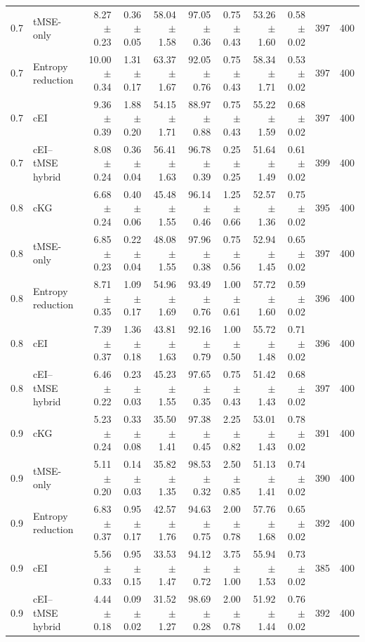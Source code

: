 \begin{tabular}{@{}clrrrrrrrrr@{}}
0.7 & tMSE-only & 8.27 $\pm$ 0.23 & 0.36 $\pm$ 0.05 & 58.04 $\pm$ 1.58 & 97.05 $\pm$ 0.36 & 0.75 $\pm$ 0.43 & 53.26 $\pm$ 1.60 & 0.58 $\pm$ 0.02 & 397 & 400 \\
0.7 & Entropy reduction & 10.00 $\pm$ 0.34 & 1.31 $\pm$ 0.17 & 63.37 $\pm$ 1.67 & 92.05 $\pm$ 0.76 & 0.75 $\pm$ 0.43 & 58.34 $\pm$ 1.71 & 0.53 $\pm$ 0.02 & 397 & 400 \\
0.7 & cEI & 9.36 $\pm$ 0.39 & 1.88 $\pm$ 0.20 & 54.15 $\pm$ 1.71 & 88.97 $\pm$ 0.88 & 0.75 $\pm$ 0.43 & 55.22 $\pm$ 1.59 & 0.68 $\pm$ 0.02 & 397 & 400 \\
0.7 & cEI--tMSE hybrid & 8.08 $\pm$ 0.24 & 0.36 $\pm$ 0.04 & 56.41 $\pm$ 1.63 & 96.78 $\pm$ 0.39 & 0.25 $\pm$ 0.25 & 51.64 $\pm$ 1.49 & 0.61 $\pm$ 0.02 & 399 & 400 \\
0.8 & cKG & 6.68 $\pm$ 0.24 & 0.40 $\pm$ 0.06 & 45.48 $\pm$ 1.55 & 96.14 $\pm$ 0.46 & 1.25 $\pm$ 0.66 & 52.57 $\pm$ 1.36 & 0.75 $\pm$ 0.02 & 395 & 400 \\
0.8 & tMSE-only & 6.85 $\pm$ 0.23 & 0.22 $\pm$ 0.04 & 48.08 $\pm$ 1.55 & 97.96 $\pm$ 0.38 & 0.75 $\pm$ 0.56 & 52.94 $\pm$ 1.45 & 0.65 $\pm$ 0.02 & 397 & 400 \\
0.8 & Entropy reduction & 8.71 $\pm$ 0.35 & 1.09 $\pm$ 0.17 & 54.96 $\pm$ 1.69 & 93.49 $\pm$ 0.76 & 1.00 $\pm$ 0.61 & 57.72 $\pm$ 1.60 & 0.59 $\pm$ 0.02 & 396 & 400 \\
0.8 & cEI & 7.39 $\pm$ 0.37 & 1.36 $\pm$ 0.18 & 43.81 $\pm$ 1.63 & 92.16 $\pm$ 0.79 & 1.00 $\pm$ 0.50 & 55.72 $\pm$ 1.48 & 0.71 $\pm$ 0.02 & 396 & 400 \\
0.8 & cEI--tMSE hybrid & 6.46 $\pm$ 0.22 & 0.23 $\pm$ 0.03 & 45.23 $\pm$ 1.55 & 97.65 $\pm$ 0.35 & 0.75 $\pm$ 0.43 & 51.42 $\pm$ 1.43 & 0.68 $\pm$ 0.02 & 397 & 400 \\
0.9 & cKG & 5.23 $\pm$ 0.24 & 0.33 $\pm$ 0.08 & 35.50 $\pm$ 1.41 & 97.38 $\pm$ 0.45 & 2.25 $\pm$ 0.82 & 53.01 $\pm$ 1.43 & 0.78 $\pm$ 0.02 & 391 & 400 \\
0.9 & tMSE-only & 5.11 $\pm$ 0.20 & 0.14 $\pm$ 0.03 & 35.82 $\pm$ 1.35 & 98.53 $\pm$ 0.32 & 2.50 $\pm$ 0.85 & 51.13 $\pm$ 1.41 & 0.74 $\pm$ 0.02 & 390 & 400 \\
0.9 & Entropy reduction & 6.83 $\pm$ 0.37 & 0.95 $\pm$ 0.17 & 42.57 $\pm$ 1.76 & 94.63 $\pm$ 0.75 & 2.00 $\pm$ 0.78 & 57.76 $\pm$ 1.68 & 0.65 $\pm$ 0.02 & 392 & 400 \\
0.9 & cEI & 5.56 $\pm$ 0.33 & 0.95 $\pm$ 0.15 & 33.53 $\pm$ 1.47 & 94.12 $\pm$ 0.72 & 3.75 $\pm$ 1.00 & 55.94 $\pm$ 1.53 & 0.73 $\pm$ 0.02 & 385 & 400 \\
0.9 & cEI--tMSE hybrid & 4.44 $\pm$ 0.18 & 0.09 $\pm$ 0.02 & 31.52 $\pm$ 1.27 & 98.69 $\pm$ 0.28 & 2.00 $\pm$ 0.78 & 51.92 $\pm$ 1.44 & 0.76 $\pm$ 0.02 & 392 & 400 \\
\bottomrule
\end{tabular}

